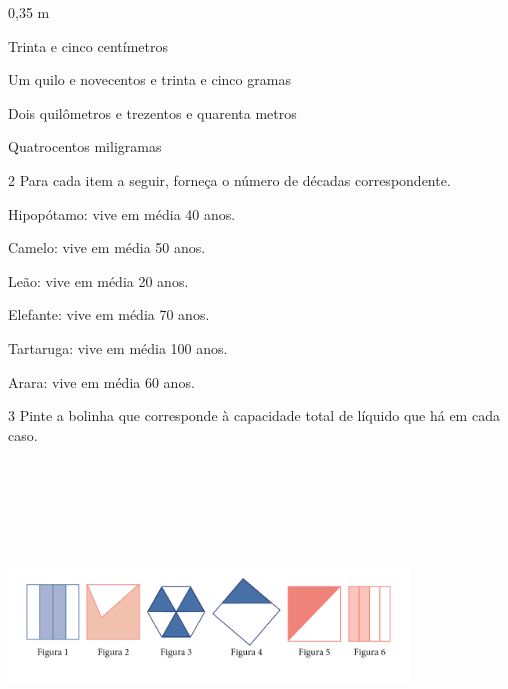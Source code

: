 \begin{mdframed}[linewidth=2pt,linecolor=salmao,roundcorner=2pt]
\begin{multicols}{2}
0,35 m 

\columnbreak

Trinta e cinco centímetros

Um quilo e novecentos e trinta e cinco gramas

Dois quilômetros e trezentos e quarenta metros

Quatrocentos miligramas
\end{multicols}


\num{2} Para cada item a seguir, forneça o número de décadas correspondente.

\begin{escolha}
\item Hipopótamo: vive em média 40 anos.

\item Camelo: vive em média 50 anos.

\item Leão: vive em média 20 anos.

\item Elefante: vive em média 70 anos.

\item Tartaruga: vive em média 100 anos.

\item Arara: vive em média 60 anos.
\end{escolha}


\num{3} Pinte a bolinha que corresponde à capacidade total de líquido que há em cada caso.

\includegraphics[width=4.17536in,height=3.42530in]{media/image52.png}


\end{mdframed}
